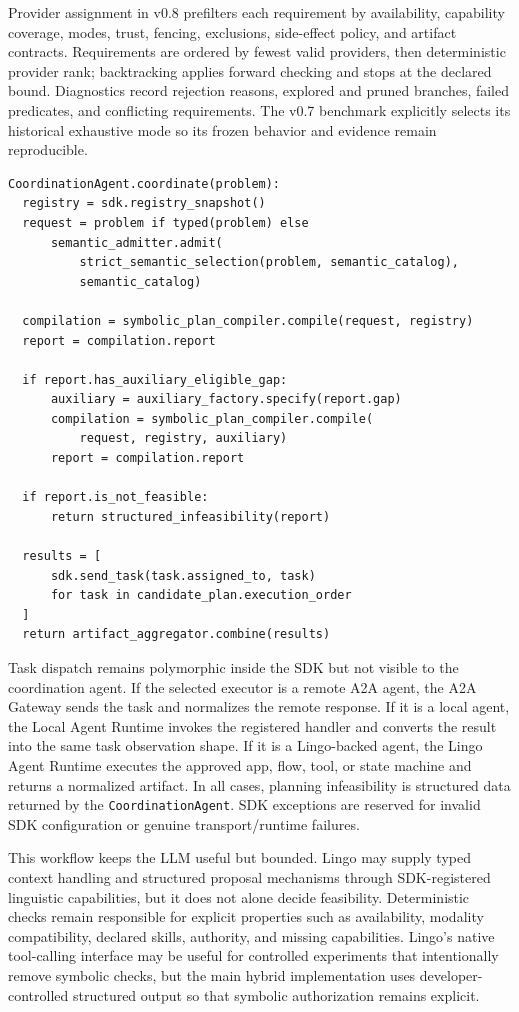 Provider assignment in v0.8 prefilters each requirement by availability, capability coverage, modes, trust, fencing, exclusions, side-effect policy, and artifact contracts. Requirements are ordered by fewest valid providers, then deterministic provider rank; backtracking applies forward checking and stops at the declared bound. Diagnostics record rejection reasons, explored and pruned branches, failed predicates, and conflicting requirements. The v0.7 benchmark explicitly selects its historical exhaustive mode so its frozen behavior and evidence remain reproducible.

\begin{Verbatim}[fontsize=\small,breaklines=true,breakanywhere=true]
CoordinationAgent.coordinate(problem):
  registry = sdk.registry_snapshot()
  request = problem if typed(problem) else
      semantic_admitter.admit(
          strict_semantic_selection(problem, semantic_catalog),
          semantic_catalog)

  compilation = symbolic_plan_compiler.compile(request, registry)
  report = compilation.report

  if report.has_auxiliary_eligible_gap:
      auxiliary = auxiliary_factory.specify(report.gap)
      compilation = symbolic_plan_compiler.compile(
          request, registry, auxiliary)
      report = compilation.report

  if report.is_not_feasible:
      return structured_infeasibility(report)

  results = [
      sdk.send_task(task.assigned_to, task)
      for task in candidate_plan.execution_order
  ]
  return artifact_aggregator.combine(results)
\end{Verbatim}

Task dispatch remains polymorphic inside the SDK but not visible to the coordination agent. If the selected executor is a remote A2A agent, the A2A Gateway sends the task and normalizes the remote response. If it is a local agent, the Local Agent Runtime invokes the registered handler and converts the result into the same task observation shape. If it is a Lingo-backed agent, the Lingo Agent Runtime executes the approved app, flow, tool, or state machine and returns a normalized artifact. In all cases, planning infeasibility is structured data returned by the \texttt{CoordinationAgent}. SDK exceptions are reserved for invalid SDK configuration or genuine transport/runtime failures.

This workflow keeps the LLM useful but bounded. Lingo may supply typed context handling and structured proposal mechanisms through SDK-registered linguistic capabilities, but it does not alone decide feasibility. Deterministic checks remain responsible for explicit properties such as availability, modality compatibility, declared skills, authority, and missing capabilities. Lingo's native tool-calling interface may be useful for controlled experiments that intentionally remove symbolic checks, but the main hybrid implementation uses developer-controlled structured output so that symbolic authorization remains explicit.

